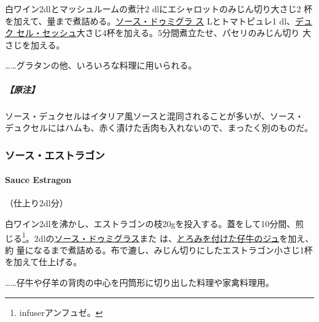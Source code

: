 白ワイン2dlとマッシュルームの煮汁2 dlにエシャロットのみじん切り大さじ2
杯を加えて、\untiers{}量まで煮詰める。\protect\hyperlink{sauce-demi-glace}{ソース・ドゥミグラ
ス}\undemi{} Lとトマトピュレ1\undemi{} dl、\href{}{デュク
セル・セッシュ}大さじ4杯を加える。5分間煮立たせ、パセリのみじん切り
大さじ\undemi{}を加える。

\ldots{}\ldots{}グラタンの他、いろいろな料理に用いられる。

\hypertarget{ux539fux6ce8-1}{%
\subparagraph{【原注】}\label{ux539fux6ce8-1}}

ソース・デュクセルはイタリア風ソースと混同されることが多いが、ソース・
デュクセルにはハムも、赤く漬けた舌肉も入れないので、まったく別のものだ。

\maeaki

\hypertarget{ux30bdux30fcux30b9ux30a8ux30b9ux30c8ux30e9ux30b4ux30f3}{%
\subsubsection{ソース・エストラゴン}\label{ux30bdux30fcux30b9ux30a8ux30b9ux30c8ux30e9ux30b4ux30f3}}

\hypertarget{sauce-estragon}{%
\paragraph{Sauce Estragon}\label{sauce-estragon}}

   

（仕上り2\undemi{}dl分）

白ワイン2dlを沸かし、エストラゴンの枝20gを投入する。蓋をして10分間、煎
じる\footnote{infuserアンフュゼ。}。2\undemi{}dlの\protect\hyperlink{sauce-demi-glace}{ソース・ドゥミグラス}また
は、\protect\hyperlink{jus-de-veau-lie}{とろみを付けた仔牛のジュ}を加え、約\deuxtiers{}
量になるまで煮詰める。布で漉し、みじん切りにしたエストラゴン小さじ1杯
を加えて仕上げる。

\ldots{}\ldots{}仔牛や仔羊の背肉の中心を円筒形に切り出した料理や家禽料理用。

\maeaki

